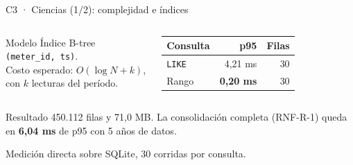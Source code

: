 \documentclass[aspectratio=169,10pt]{beamer}
\newcommand{\good}[1]{\textcolor{GoodGreen}{\textbf{#1}}}
\newcommand{\code}[1]{\texttt{\small #1}}
\begin{document}
\begin{frame}{C3 · Ciencias (1/2): complejidad e índices}
  \begin{columns}[T,onlytextwidth]
      \begin{block}{Modelo}
        Índice B-tree \code{(meter\_id, ts)}.\\
        Costo esperado: $O(\log N + k)$, con $k$ lecturas del período.
      \end{block}
      \centering
      \scriptsize
      \begin{tabular}{@{}lrr@{}}
        \toprule
        Consulta & p95 & Filas \\
        \midrule
        \code{LIKE} & 4,21 ms & 30 \\
        Rango & \good{0,20 ms} & 30 \\
        \bottomrule
      \end{tabular}
  \end{columns}
  \vspace{2mm}
  \begin{block}{Resultado}
    450.112 filas y 71,0 MB. La consolidación completa (RNF-R-1) queda en
    \good{6,04 ms} de p95 con 5 años de datos.
  \end{block}
  {\scriptsize Medición directa sobre SQLite, 30 corridas por consulta.}
\end{frame}
\end{document}
